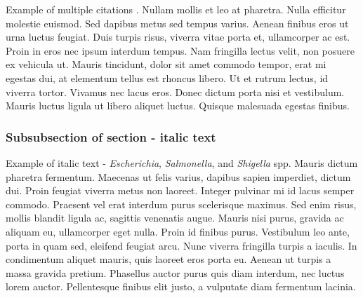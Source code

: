 Example of multiple citations \citep{altschul1997gapped,baker2007novel}. Nullam mollis et leo at pharetra. Nulla efficitur molestie euismod. Sed dapibus metus sed tempus varius. Aenean finibus eros ut urna luctus feugiat. Duis turpis risus, viverra vitae porta et, ullamcorper ac est. Proin in eros nec ipsum interdum tempus. Nam fringilla lectus velit, non posuere ex vehicula ut. Mauris tincidunt, dolor sit amet commodo tempor, erat mi egestas dui, at elementum tellus est rhoncus libero. Ut et rutrum lectus, id viverra tortor. Vivamus nec lacus eros. Donec dictum porta nisi et vestibulum. Mauris luctus ligula ut libero aliquet luctus. Quisque malesuada egestas finibus. 

\subsubsection{Subsubsection of section - italic text}
Example of italic text - {\it Escherichia}, {\it Salmonella}, and {\it Shigella} spp. Mauris dictum pharetra fermentum. Maecenas ut felis varius, dapibus sapien imperdiet, dictum dui. Proin feugiat viverra metus non laoreet. Integer pulvinar mi id lacus semper commodo. Praesent vel erat interdum purus scelerisque maximus. Sed enim risus, mollis blandit ligula ac, sagittis venenatis augue. Mauris nisi purus, gravida ac aliquam eu, ullamcorper eget nulla. Proin id finibus purus. Vestibulum leo ante, porta in quam sed, eleifend feugiat arcu. Nunc viverra fringilla turpis a iaculis. In condimentum aliquet mauris, quis laoreet eros porta eu. Aenean ut turpis a massa gravida pretium. Phasellus auctor purus quis diam interdum, nec luctus lorem auctor. Pellentesque finibus elit justo, a vulputate diam fermentum lacinia. 
